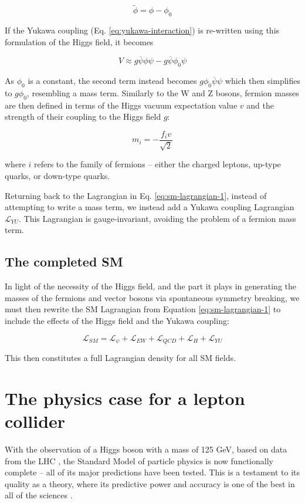 \begin{equation}
	\tilde{\phi} = \phi - \phi_0
\end{equation}

If the Yukawa coupling (Eq. \ref{eq:yukawa-interaction}) is re-written using this formulation of the Higgs field, it becomes

\begin{equation}
	V \approx g \overline{\psi} \phi \psi - g \overline{\psi} \phi_0 \psi
\end{equation}

As $\phi_0$ is a constant, the second term instead becomes $g \phi_0 \overline{\psi} \psi$ which then simplifies to $g \phi_0$, resembling a mass term. Similarly to the W and Z bosons, fermion masses are then defined in terms of the Higgs vacuum expectation value $v$ and the strength of their coupling to the Higgs field $g$:

\begin{equation}
	m_i = -\frac{f_i v}{\sqrt{2}}
\end{equation}

where $i$ refers to the family of fermions -- either the charged leptons, up-type quarks, or down-type quarks.

Returning back to the Lagrangian in Eq. \ref{eq:sm-lagrangian-1}, instead of attempting to write a mass term, we instead add a Yukawa coupling Lagrangian $\mathcal{L}_{YU}$. This Lagrangian is gauge-invariant, avoiding the problem of a fermion mass term.

\subsection{The completed \acrlong{SM}}
In light of the necessity of the Higgs field, and the part it plays in generating the masses of the fermions and vector bosons via spontaneous symmetry breaking, we must then rewrite the \acrshort{SM} Lagrangian from Equation \ref{eq:sm-lagrangian-1} to include the effects of the Higgs field and the Yukawa coupling:

\begin{equation}
	\mathcal{L}_{SM} = \mathcal{L}_{\psi} + \mathcal{L}_{EW} + \mathcal{L}_{QCD} + \mathcal{L}_{H} + \mathcal{L}_{YU}
\label{eq:sm-lagrangian-2}
\end{equation}

This then constitutes a full Lagrangian density for all \acrlong{SM} fields.

\section{The physics case for a lepton collider}
With the observation of a Higgs boson with a mass of 125 GeV, based on data from the \acrlong{LHC} \cite{higgs-atlas} \cite{higgs-cms}, the Standard Model of particle physics is now functionally complete -- all of its major predictions have been tested. This is a testament to its quality as a theory, where its predictive power and accuracy is one of the best in all of the sciences \cite{particle-physics-review}.

